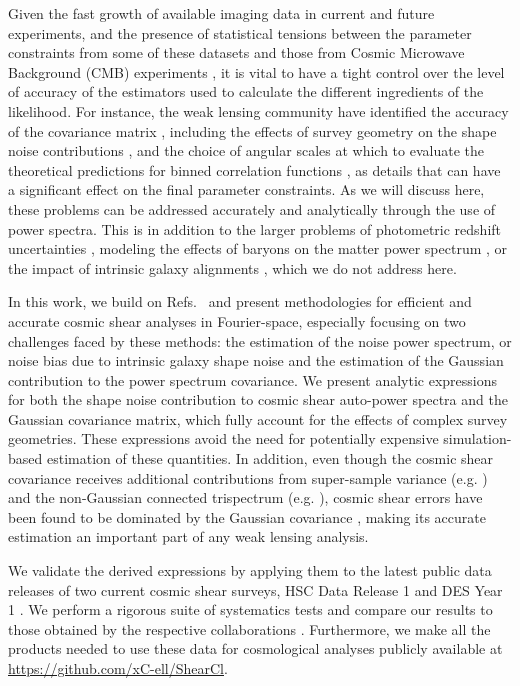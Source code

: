 \documentclass[a4paper,11pt]{article}
\begin{document}
    Given the fast growth of available imaging data in current and future experiments, and the presence of statistical tensions between the parameter constraints from some of these datasets and those from Cosmic Microwave Background (CMB) experiments \cite{1708.01530,1809.09148,1906.09262,2007.15632}, it is vital to have a tight control over the level of accuracy of the estimators used to calculate the different ingredients of the likelihood. For instance, the weak lensing community have identified the accuracy of the covariance matrix \cite{1202.2332,1606.05338,1905.06454}, including the effects of survey geometry on the shape noise contributions \cite{1804.10663}, and the choice of angular scales at which to evaluate the theoretical predictions for binned correlation functions \cite{1707.06627,1804.10663}, as details that can have a significant effect on the final parameter constraints. As we will discuss here, these problems can be addressed accurately and analytically through the use of power spectra. This is in addition to the larger problems of photometric redshift uncertainties \cite{1602.05960,1906.09262,1909.09632,2004.09542}, modeling the effects of baryons on the matter power spectrum \cite{1111.0052,1407.4301,1904.07905,1905.06082}, or the impact of intrinsic galaxy alignments \cite{astro-ph/0005269,astro-ph/0005384,1305.5791,1303.1808}, which we do not address here.

    In this work, we build on Refs.~\cite{1004.3542, 1603.07818} and present methodologies for efficient and accurate cosmic shear analyses in Fourier-space, especially focusing on two challenges faced by these methods: the estimation of the noise power spectrum, or noise bias due to intrinsic galaxy shape noise and the estimation of the Gaussian contribution to the power spectrum covariance. We present analytic expressions for both the shape noise contribution to cosmic shear auto-power spectra and the Gaussian covariance matrix, which fully account for the effects of complex survey geometries. These expressions avoid the need for potentially expensive simulation-based estimation of these quantities. In addition, even though the cosmic shear covariance receives additional contributions from super-sample variance (e.g. \cite{1302.6994}) and the non-Gaussian connected trispectrum (e.g. \cite{astro-ph/0012087}), cosmic shear errors have been found to be dominated by the Gaussian covariance \cite{1807.04266}, making its accurate estimation an important part of any weak lensing analysis.
    
    We validate the derived expressions by applying them to the latest public data releases of two current cosmic shear surveys, HSC Data Release 1 \cite{1702.08449} and DES Year 1 \cite{1801.03181,1708.01531}. We perform a rigorous suite of systematics tests and compare our results to those obtained by the respective collaborations \cite{1708.01538, 1809.09148}. Furthermore, we make all the products needed to use these data for cosmological analyses publicly available at \url{https://github.com/xC-ell/ShearCl}.
    
\end{document}

